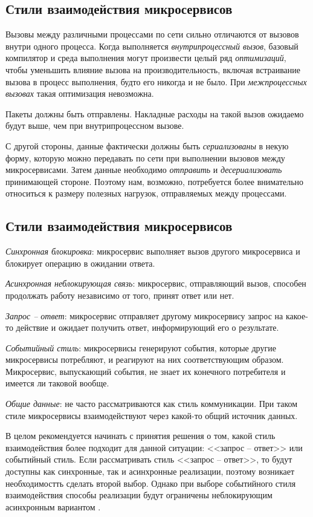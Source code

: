 \documentclass[%
	11pt,
	a4paper,
	utf8,
		]{article}
\begin{document}
\subsection{Стили взаимодействия микросервисов}

Вызовы между различными процессами по сети сильно отличаются от вызовов внутри одного процесса. Когда выполняется \emph{внутрипроцессный вызов}, базовый компилятор и среда выполнения могут произвести целый ряд \emph{оптимизаций}, чтобы уменьшить влияние вызова на производительность, включая встраивание вызова в процесс выполнения, будто его никогда и не было. {\color{red}При \emph{межпроцессных вызовах} такая оптимизация невозможна.}

Пакеты должны быть отправлены. Накладные расходы на такой вызов ожидаемо будут выше, чем при внутрипроцессном вызове.

С другой стороны, данные фактически должны быть \emph{сериализованы} в некую форму, которую можно передавать по сети при выполнении вызовов между микросервисами. Затем данные необходимо \emph{отправить} и \emph{десериализовать} принимающей стороне. Поэтому нам, возможно, потребуется более внимательно относиться к размеру полезных нагрузок, отправляемых между процессами.

\subsection{Стили взаимодействия микросервисов}

\emph{Синхронная блокировка}: микросервис выполняет вызов другого микросервиса и блокирует операцию в ожидании ответа.

\emph{Асинхронная неблокирующая связь}: микросервис, отправляющий вызов, способен продолжать работу независимо от того, принят ответ или нет.

\emph{Запрос -- ответ}: микросервис отправляет другому микросервису запрос на какое-то действие и ожидает получить ответ, информирующий его о результате.

\emph{Событийный стиль}: микросервисы генерируют события, которые другие микросервисы потребляют, и реагируют на них соответствующим образом. Микросервис, выпускающий события, не знает их конечного потребителя и имеется ли таковой вообще.

\emph{Общие данные}: не часто рассматриваются как стиль коммуникации. При таком стиле микросервисы взаимодействуют через какой-то общий источник данных.

В целом рекомендуется начинать с принятия решения о том, какой стиль взаимодействия более подходит для данной ситуации: <<запрос -- ответ>> или событийный стиль. Если рассматривать стиль <<запрос -- ответ>>, то будут доступны как синхронные, так и асинхронные реализации, поэтому возникает необходимостть сделать второй выбор. Однако при выборе событийного стиля взаимодействия способы реализации будут ограничены неблокирующим асинхронным вариантом \cite[]{microservices-2024}.
\end{document}
